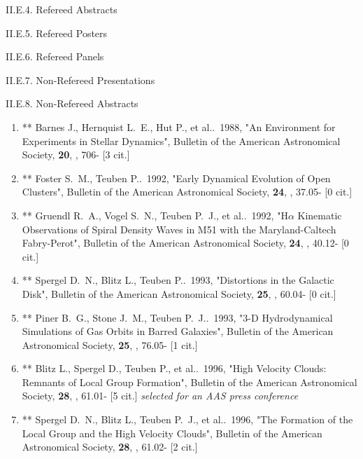 \documentclass[11pt,letterpaper]{article}
\begin{document}
II.E.4. Refereed Abstracts

II.E.5. Refereed Posters

II.E.6. Refereed Panels

II.E.7. Non-Refereed Presentations

II.E.8. Non-Refereed Abstracts


\begin{enumerate}[resume,label=\textbf{\arabic*}.]
\item  **
  Barnes J., Hernquist L.~E., Hut P., et al..\  1988,  "An Environment 
for Experiments in Stellar Dynamics", Bulletin of the American Astronomical 
Society,  {\bf 20}, , 706- [3 cit.] %

\item    **
  Foster S.~M., Teuben P..\  1992,  "Early Dynamical Evolution of Open 
Clusters", Bulletin of the American Astronomical Society,  {\bf 24}, , 
37.05- [0 cit.] %

\item    **
  Gruendl R.~A., Vogel S.~N., Teuben P.~J., et al..\  1992,  
"H{$\alpha$} Kinematic Observations of Spiral Density Waves in M51 with the 
Maryland-Caltech Fabry-Perot", Bulletin of the American Astronomical 
Society,  {\bf 24}, , 40.12- [0 cit.] %

\item    **
  Spergel D.~N., Blitz L., Teuben P..\  1993,  "Distortions in the 
Galactic Disk", Bulletin of the American Astronomical Society,  {\bf 25}, , 
60.04- [0 cit.] %

\item    **
  Piner B.~G., Stone J.~M., Teuben P.~J..\  1993,  "3-D Hydrodynamical 
Simulations of Gas Orbits in Barred Galaxies", Bulletin of the American 
Astronomical Society,  {\bf 25}, , 76.05- [1 cit.] %


\item  **
  Blitz L., Spergel D., Teuben P., et al..\  1996,  "High Velocity 
Clouds: Remnants of Local Group Formation", Bulletin of the American 
Astronomical Society,  {\bf 28}, , 61.01- [5 cit.] %
{\it selected for an AAS press conference}



\item  **
  Spergel D.~N., Blitz L., Teuben P.~J., et al..\  1996,  "The 
Formation of the Local Group and the High Velocity Clouds", Bulletin of the 
American Astronomical Society,  {\bf 28}, , 61.02- [2 cit.] %


\end{enumerate}
\end{document}

